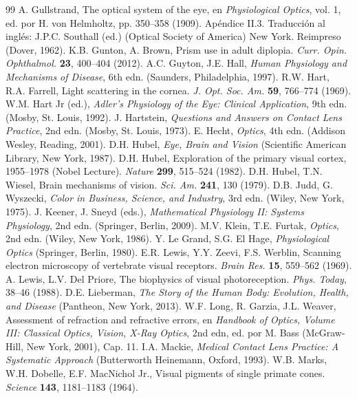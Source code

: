 \documentclass[12pt]{book}
\begin{document}
\begin{thebibliography}{99}
 A. Gullstrand, The optical system of the eye, en \textit{Physiological Optics}, vol. 1, ed. por H. von Helmholtz, pp. 350--358 (1909). Apéndice II.3. Traducción al inglés: J.P.C. Southall (ed.) (Optical Society of America) New York. Reimpreso (Dover, 1962).
 K.B. Gunton, A. Brown, Prism use in adult diplopia. \textit{Curr. Opin. Ophthalmol.} \textbf{23}, 400--404 (2012).
 A.C. Guyton, J.E. Hall, \textit{Human Physiology and Mechanisms of Disease}, 6th edn. (Saunders, Philadelphia, 1997).
 R.W. Hart, R.A. Farrell, Light scattering in the cornea. \textit{J. Opt. Soc. Am.} \textbf{59}, 766--774 (1969).
 W.M. Hart Jr (ed.), \textit{Adler's Physiology of the Eye: Clinical Application}, 9th edn. (Mosby, St. Louis, 1992).
 J. Hartstein, \textit{Questions and Answers on Contact Lens Practice}, 2nd edn. (Mosby, St. Louis, 1973).
 E. Hecht, \textit{Optics}, 4th edn. (Addison Wesley, Reading, 2001).
 D.H. Hubel, \textit{Eye, Brain and Vision} (Scientific American Library, New York, 1987).
 D.H. Hubel, Exploration of the primary visual cortex, 1955--1978 (Nobel Lecture). \textit{Nature} \textbf{299}, 515--524 (1982).
 D.H. Hubel, T.N. Wiesel, Brain mechanisms of vision. \textit{Sci. Am.} \textbf{241}, 130 (1979).
 D.B. Judd, G. Wyszecki, \textit{Color in Business, Science, and Industry}, 3rd edn. (Wiley, New York, 1975).
 J. Keener, J. Sneyd (eds.), \textit{Mathematical Physiology II: Systems Physiology}, 2nd edn. (Springer, Berlin, 2009).
 M.V. Klein, T.E. Furtak, \textit{Optics}, 2nd edn. (Wiley, New York, 1986).
 Y. Le Grand, S.G. El Hage, \textit{Physiological Optics} (Springer, Berlin, 1980).
 E.R. Lewis, Y.Y. Zeevi, F.S. Werblin, Scanning electron microscopy of vertebrate visual receptors. \textit{Brain Res.} \textbf{15}, 559--562 (1969).
 A. Lewis, L.V. Del Priore, The biophysics of visual photoreception. \textit{Phys. Today}, 38--46 (1988).
 D.E. Lieberman, \textit{The Story of the Human Body: Evolution, Health, and Disease} (Pantheon, New York, 2013).
 W.F. Long, R. Garzia, J.L. Weaver, Assessment of refraction and refractive errors, en \textit{Handbook of Optics, Volume III: Classical Optics, Vision, X-Ray Optics}, 2nd edn, ed. por M. Bass (McGraw-Hill, New York, 2001), Cap. 11.
 I.A. Mackie, \textit{Medical Contact Lens Practice: A Systematic Approach} (Butterworth Heinemann, Oxford, 1993).
 W.B. Marks, W.H. Dobelle, E.F. MacNichol Jr., Visual pigments of single primate cones. \textit{Science} \textbf{143}, 1181--1183 (1964).

\end{thebibliography}
\end{document}
